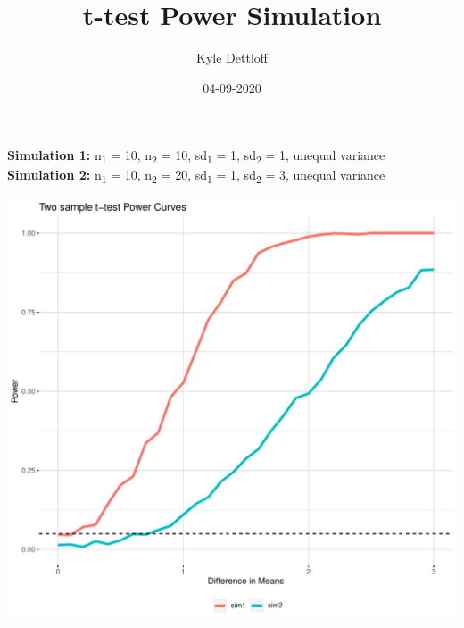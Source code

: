 \documentclass[]{article}
\title{t-test Power Simulation}
\author{Kyle Dettloff}
\date{04-09-2020}
\begin{document}
\maketitle


\textbf{Simulation 1:} n\textsubscript{1} = 10, n\textsubscript{2} = 10,
sd\textsubscript{1} = 1, sd\textsubscript{2} = 1, unequal variance\\
\textbf{Simulation 2:} n\textsubscript{1} = 10, n\textsubscript{2} = 20,
sd\textsubscript{1} = 1, sd\textsubscript{2} = 3, unequal variance\\

\begin{center}\includegraphics{markdownExample_files/figure-latex/unnamed-chunk-2-1} \end{center}

\newpage
\end{document}
